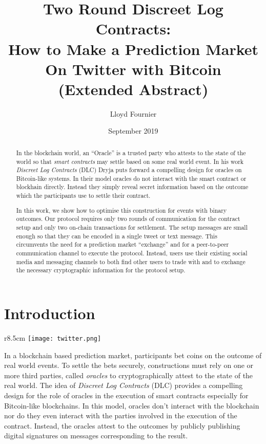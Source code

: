 \documentclass{article}
\title{Two Round Discreet Log Contracts: \\ How to Make a Prediction Market On Twitter with Bitcoin \\ (Extended Abstract)}
\author{Lloyd Fournier}
\date{September 2019}
\theoremstyle{definition}
\begin{document}
\maketitle

\begin{abstract}



  In the blockchain world, an ``Oracle'' is a trusted party who attests to the state of the world so that \emph{smart contracts} may settle based on some real world event. In his work \emph{Discreet Log Contracts} (DLC) Dryja puts forward a compelling design for oracles on Bitcoin-like systems. In their model oracles do not interact with the smart contract or blockhain directly. Instead they simply reveal secret information based on the outcome which the participants use to settle their contract.

  In this work, we show how to optimise this construction for events with binary outcomes. Our protocol requires only two rounds of communication for the contract setup and only two on-chain transactions for settlement. The setup messages are small enough so that they can be encoded in a single tweet or text message. This circumvents the need for a prediction market ``exchange'' and for a peer-to-peer communication channel to execute the protocol. Instead, users use their existing social media and messaging channels to both find other users to trade with and to exchange the necessary cryptographic information for the protocol setup.

\end{abstract}

\section{Introduction}


\begin{wrapfigure}{r}{8.5cm}
  \centering
  \vspace{-1cm}
  \texttt{[image: twitter.png]}
\end{wrapfigure}

In a blockchain based prediction market, participants bet coins on the outcome of real world events.
To settle the bets securely, constructions must rely on one or more third parties, called \textit{oracles} to cryptographically attest to the state of the real world. The idea of \textit{Discreet Log Contracts} (DLC) provides a compelling design for the role of oracles in the execution of smart contracts especially for Bitcoin-like blockchains. In this model, oracles don't interact with the blockchain nor do they even interact with the parties involved in the execution of the contract. Instead, the oracles attest to the outcomes by publicly publishing digital signatures on messages corresponding to the result.
\end{document}

